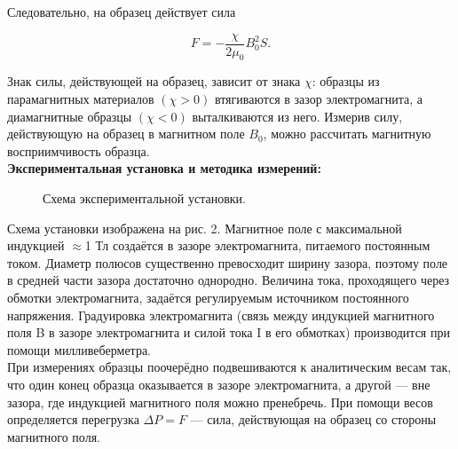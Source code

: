 \documentclass[a4paper, 12pt]{article}%
\begin{document}
	Следовательно, на образец действует сила
	
	\begin{equation}\label{4}
		F = -\frac{\chi}{2\mu_0}B^2_0S.
	\end{equation}
	
	Знак силы, действующей на образец, зависит от знака $ \chi $: образцы из парамагнитных материалов $( \chi  > 0)$ втягиваются в зазор электромагнита, а диамагнитные образцы $ (\chi < 0) $ выталкиваются из него. Измерив силу, действующую на образец в магнитном поле $ B_0 $, можно рассчитать магнитную восприимчивость образца.\\
	
	\textbf{Экспериментальная установка и методика измерений: }\\
	
		\begin{figure}[h]
		\caption{Схема экспериментальной установки.}
	\end{figure}
	
	Схема установки изображена на рис. 2. Магнитное поле с максимальной индукцией $\approx $1 Тл создаётся в зазоре электромагнита, питаемого
	постоянным током. Диаметр полюсов существенно превосходит ширину зазора, поэтому поле в средней части зазора достаточно однородно.
	Величина тока, проходящего через обмотки электромагнита, задаётся
	регулируемым источником постоянного напряжения.
	Градуировка электромагнита (связь между индукцией магнитного
	поля B в зазоре электромагнита и силой тока I в его обмотках) производится при помощи милливеберметра.\\
	
	При измерениях образцы поочерёдно подвешиваются к аналитическим весам так, что один конец образца оказывается в зазоре электромагнита, а другой — вне зазора, где индукцией магнитного поля можно
	пренебречь. При помощи весов определяется перегрузка $\Delta P = F$ — сила, действующая на образец со стороны магнитного
	поля.\\
	
\end{document}
